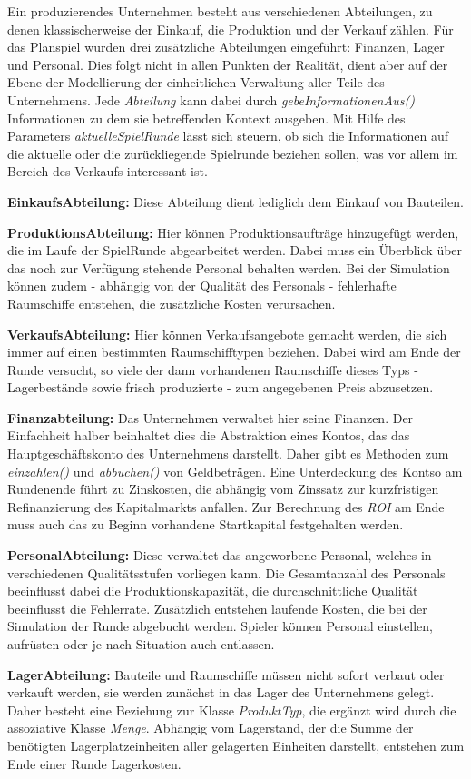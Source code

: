 Ein produzierendes Unternehmen besteht aus verschiedenen Abteilungen, zu denen klassischerweise der Einkauf, die Produktion und der Verkauf zählen. Für das Planspiel wurden drei zusätzliche Abteilungen eingeführt: Finanzen, Lager und Personal. Dies folgt nicht in allen Punkten der Realität, dient aber auf der Ebene der Modellierung der einheitlichen Verwaltung aller Teile des Unternehmens. Jede \textit{Abteilung} kann dabei durch \textit{gebeInformationenAus()} Informationen zu dem sie betreffenden Kontext ausgeben. Mit Hilfe des Parameters \textit{aktuelleSpielRunde} lässt sich steuern, ob sich die Informationen auf die aktuelle oder die zurückliegende Spielrunde beziehen sollen, was vor allem im Bereich des Verkaufs interessant ist.

\begin{seList}
\item \textbf{EinkaufsAbteilung:} Diese Abteilung dient lediglich dem Einkauf von Bauteilen.
\item \textbf{ProduktionsAbteilung:} Hier können Produktionsaufträge hinzugefügt werden, die im Laufe der SpielRunde abgearbeitet werden. Dabei muss ein Überblick über das noch zur Verfügung stehende Personal behalten werden. Bei der Simulation können zudem - abhängig von der Qualität des Personals - fehlerhafte Raumschiffe entstehen, die zusätzliche Kosten verursachen.
\item \textbf{VerkaufsAbteilung:} Hier können Verkaufsangebote gemacht werden, die sich immer auf einen bestimmten Raumschifftypen beziehen. Dabei wird am Ende der Runde versucht, so viele der dann vorhandenen Raumschiffe dieses Typs - Lagerbestände sowie frisch produzierte - zum angegebenen Preis abzusetzen.
\item \textbf{Finanzabteilung:} Das Unternehmen verwaltet hier seine Finanzen. Der Einfachheit halber beinhaltet dies die Abstraktion eines Kontos, das das Hauptgeschäftskonto des Unternehmens darstellt. Daher gibt es Methoden zum \textit{einzahlen()} und \textit{abbuchen()} von Geldbeträgen. Eine Unterdeckung des Kontso am Rundenende führt zu Zinskosten, die abhängig vom Zinssatz zur kurzfristigen Refinanzierung des Kapitalmarkts anfallen. Zur Berechnung des \textit{ROI} am Ende muss auch das zu Beginn vorhandene Startkapital festgehalten werden.
\item \textbf{PersonalAbteilung:} Diese verwaltet das angeworbene Personal, welches in verschiedenen Qualitätsstufen vorliegen kann. Die Gesamtanzahl des Personals beeinflusst dabei die Produktionskapazität, die durchschnittliche Qualität beeinflusst die Fehlerrate. Zusätzlich entstehen laufende Kosten, die bei der Simulation der Runde abgebucht werden. Spieler können Personal einstellen, aufrüsten oder je nach Situation auch entlassen.
\item \textbf{LagerAbteilung:} Bauteile und Raumschiffe müssen nicht sofort verbaut oder verkauft werden, sie werden zunächst in das Lager des Unternehmens gelegt. Daher besteht eine Beziehung zur Klasse \textit{ProduktTyp}, die ergänzt wird durch die assoziative Klasse \textit{Menge}. Abhängig vom Lagerstand, der die Summe der benötigten Lagerplatzeinheiten aller gelagerten Einheiten darstellt, entstehen zum Ende einer Runde Lagerkosten.
\end{seList}

